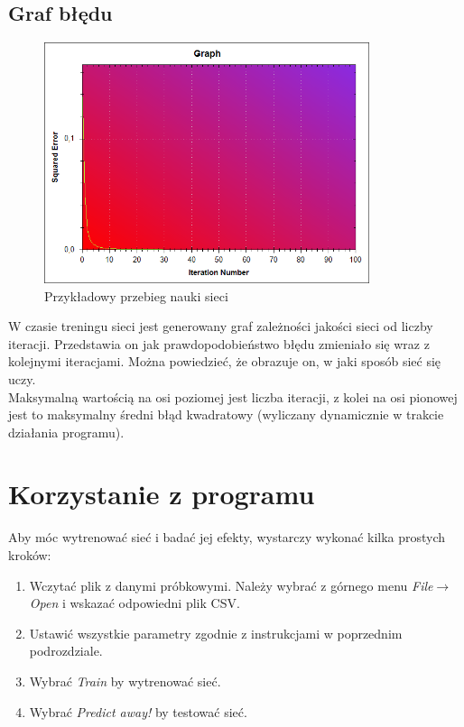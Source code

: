\documentclass[a4paper]{article}
\begin{document}
			\subsection{Graf błędu}
				\begin{figure}[h!]
					\centering
					\includegraphics[width=0.85\textwidth]{./img/GUI_graph}
					\caption{Przykładowy przebieg nauki sieci}
				\end{figure}
				W czasie treningu sieci jest generowany graf zależności jakości sieci od liczby iteracji. Przedstawia on jak prawdopodobieństwo błędu zmieniało się wraz z kolejnymi iteracjami. Można powiedzieć, że obrazuje on, w jaki sposób sieć się uczy.\\\indent
				Maksymalną wartością na osi poziomej jest liczba iteracji, z kolei na osi pionowej jest to maksymalny średni błąd kwadratowy (wyliczany dynamicznie w trakcie działania programu).
		\section{Korzystanie z programu}
			Aby móc wytrenować sieć i badać jej efekty, wystarczy wykonać kilka prostych kroków:
			\begin{enumerate}
				\item Wczytać plik z danymi próbkowymi. Należy wybrać z górnego menu \textit{File}$ \rightarrow $\emph{Open} i wskazać odpowiedni plik CSV.
				\item Ustawić wszystkie parametry zgodnie z instrukcjami w poprzednim podrozdziale.
				\item Wybrać \emph{Train} by wytrenować sieć.
				\item Wybrać \emph{Predict away!} by testować sieć.
			\end{enumerate}
\end{document}
